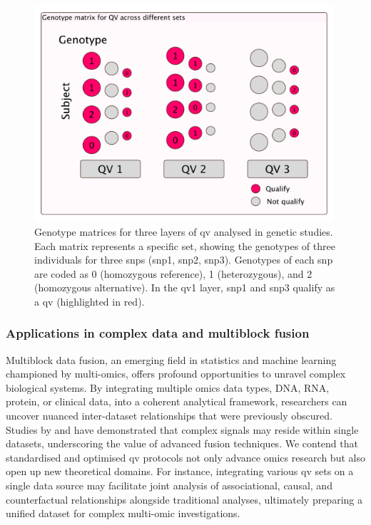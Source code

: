 \begin{figure}[h]
    \centering
   \includegraphics[width=0.99\textwidth]{./images/qv_matrix.pdf}
    \caption{Genotype matrices for three layers of \ac{qv} analysed in genetic studies. Each matrix represents a specific set, showing the genotypes of three individuals for three \ac{snp}s (\ac{snp}1, \ac{snp}2, \ac{snp}3). 
Genotypes of each \ac{snp} are coded as 0 (homozygous reference), 1 (heterozygous), and 2 (homozygous alternative).    
    In the \ac{qv}1 layer, \ac{snp}1 and \ac{snp}3 qualify as a \ac{qv} (highlighted in red). }
    \label{fig:qv_matrix}
\end{figure}

\subsubsection{Applications in complex data and multiblock fusion} 

Multiblock data fusion, an emerging field in statistics and machine learning championed by multi-omics, offers profound opportunities to unravel complex biological systems. By integrating multiple omics data types, DNA, RNA, protein, or clinical data, into a coherent analytical framework, researchers can uncover nuanced inter-dataset relationships that were previously obscured. Studies by \citet{kong2018nature} and \citet{howe2021within} have demonstrated that complex signals may reside within single datasets, underscoring the value of advanced fusion techniques. We contend that standardised and optimised \ac{qv} protocols not only advance omics research but also open up new theoretical domains. For instance, integrating various \ac{qv} sets on a single data source may facilitate joint analysis of associational, causal, and counterfactual relationships alongside traditional analyses, ultimately preparing a unified dataset for complex multi-omic investigations.

